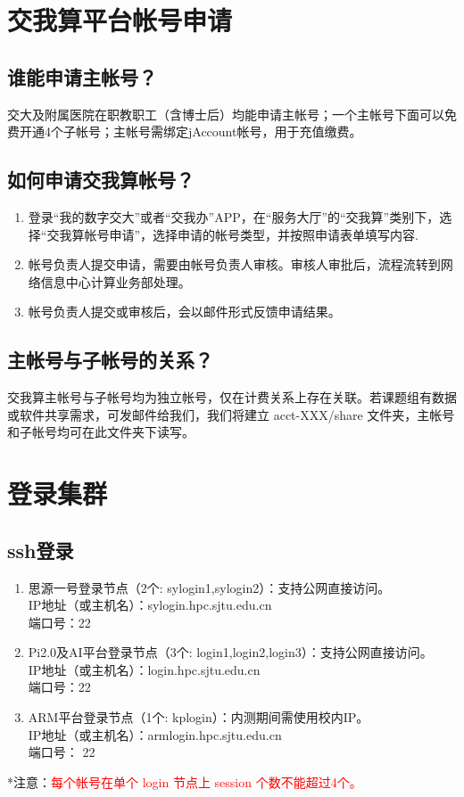 \documentclass[cn, 12pt, hang, black, chinese]{elegantbook}
\begin{document}
\section{交我算平台帐号申请}

\subsection*{谁能申请主帐号？}
交大及附属医院在职教职工（含博士后）均能申请主帐号；一个主帐号下面可以免费开通4个子帐号；主帐号需绑定jAccount帐号，用于充值缴费。

\subsection*{如何申请交我算帐号？}
\begin{enumerate}
\item 登录“我的数字交大”或者“交我办”APP，在“服务大厅”的“交我算”类别下，选择“交我算帐号申请”，选择申请的帐号类型，并按照申请表单填写内容.
\item 帐号负责人提交申请，需要由帐号负责人审核。审核人审批后，流程流转到网络信息中心计算业务部处理。
\item 帐号负责人提交或审核后，会以邮件形式反馈申请结果。
\end{enumerate}

\subsection*{主帐号与子帐号的关系？}
交我算主帐号与子帐号均为独立帐号，仅在计费关系上存在关联。若课题组有数据或软件共享需求，可发邮件给我们，我们将建立 acct-XXX/share 文件夹，主帐号和子帐号均可在此文件夹下读写。

\section{登录集群}

\subsection*{ssh登录}
\begin{enumerate}
\item 思源一号登录节点（2个: sylogin1,sylogin2）：支持公网直接访问。\\IP地址（或主机名）：sylogin.hpc.sjtu.edu.cn\\端口号：22
\item Pi2.0及AI平台登录节点（3个: login1,login2,login3）：支持公网直接访问。\\IP地址（或主机名）：login.hpc.sjtu.edu.cn\\端口号：22
\item ARM平台登录节点（1个: kplogin）：内测期间需使用校内IP。\\IP地址（或主机名）：armlogin.hpc.sjtu.edu.cn\\端口号： 22
\end{enumerate}
*注意：\textcolor{red}{每个帐号在单个 login 节点上 session 个数不能超过4个。}
\end{document}
